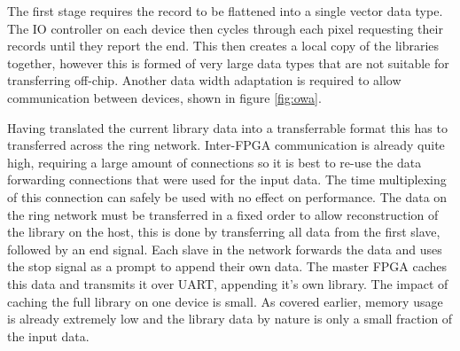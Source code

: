 The first stage requires the record to be flattened into a single vector data type. The IO controller on each device then cycles through each pixel requesting their records until they report the end. This then creates a local copy of the libraries together, however this is formed of very large data types that are not suitable for transferring off-chip. Another data width adaptation is required to allow communication between devices, shown in figure \ref{fig:owa}. 


Having translated the current library data into a transferrable format this has to transferred across the ring network. Inter-FPGA communication is already quite high, requiring a large amount of connections so it is best to re-use the data forwarding connections that were used for the input data. The time multiplexing of this connection can safely be used with no effect on performance. The data on the ring network must be transferred in a fixed order to allow reconstruction of the library on the host, this is done by transferring all data from the first slave, followed by an end signal. Each slave in the network forwards the data and uses the stop signal as a prompt to append their own data. The master FPGA caches this data and transmits it over UART, appending it's own library. The impact of caching the full library on one device is small. As covered earlier, memory usage is already extremely low and the library data by nature is only a small fraction of the input data.



